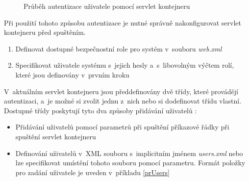                 \begin{figure}[h!t]
                    \begin{center}
                        \caption{Průběh autentizace uživatele pomocí servlet kontejneru}
                        \label{imgSecurity}
                    \end{center}
                \end{figure}

                Při použití tohoto způsobu autentizace je nutné správně nakonfigurovat servlet kontejneru před spuštěním.
                
                \begin{enumerate}
                    \item Definovat dostupné bezpečnostní role pro systém v~souboru \emph{web.xml}
                    \item Specifikovat uživatele systému s~jejich hesly a~s~libovolným výčtem rolí, které
                        jsou definovány v~prvním kroku
                \end{enumerate}

                V~aktuálním servlet kontejneru jsou předdefinovány dvě třídy, které provádějí autentizaci,
                a~je možné si zvolit jednu z~nich nebo si dodefinovat třídu vlastní.
                Dostupné třídy poskytují tyto dva způsoby přidávání uživatelů \cite{securityArchitectureWinstone}:

                \begin{itemize}
                    \item Přidávání uživatelů pomocí parametrů při spuštění příkazové řádky při spuštění servlet kontejneru 
                    \item Definování uživatelů v~XML souboru s~implicitním jménem \emph{users.xml} nebo 
                        lze specifikovat umístění tohoto souboru pomocí parametru. Formát položky
                        pro zadání uživatele je uveden v~příkladu \ref{prUsers}
                \end{itemize}

